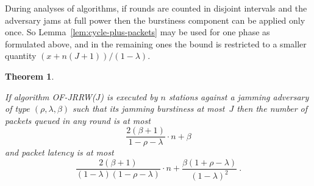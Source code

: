 \documentclass[11pt]{article}
\newtheorem{theorem}{Theorem}
\begin{document}
During analyses of algorithms, if rounds are counted in disjoint intervals and the adversary jams at full power then the burstiness component can be applied only once.
So Lemma~\ref{lem:cycle-plus-packets} may be used for one phase  as formulated above, and in the remaining ones the bound is restricted to a smaller quantity $(x + n(J+1))/(1-\lambda)$.


\begin{theorem}
\label{thm:OF-JRRW(J)-jamming}

If algorithm \textsc{OF-JRRW($J$)} is executed by $n$ stations against a jamming adversary of type $(\rho,\lambda,\beta)$ such that its jamming burstiness at most~$J$ then the number of packets  queued in any round is at most
\begin{equation}
\label{eqn:OF-JRRW(J)-queues}
\frac{2(\beta+1)}{1-\rho-\lambda} \cdot n+\beta
\end{equation}
and packet latency  is  at most 
\begin{equation}
\label{eqn:OF-JRRW(J)-latency}
\frac{2(\beta+1)}{(1-\lambda)(1-\rho-\lambda)} \cdot n + \frac{\beta(1+\rho-\lambda)}{(1-\lambda)^2}    
\ .
\end{equation}
\end{theorem}
\end{document}
